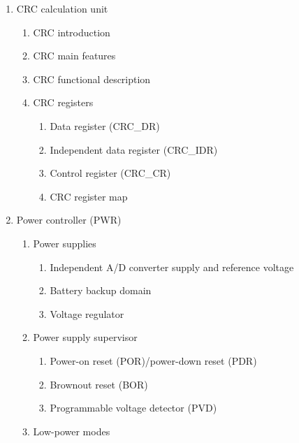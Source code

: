 \documentclass{article}
\begin{document}
\begin{enumerate}
\begin{enumerate}
\begin{enumerate}
            \item Flash option control register (FLASH\_OPTCR) 
            \item Flash interface register map 
        \end{enumerate}
    \end{enumerate}
    \item CRC calculation unit 
    \begin{enumerate}
        \item CRC introduction 
        \item CRC main features 
        \item CRC functional description 
        \item CRC registers 
        \begin{enumerate}
            \item Data register (CRC\_DR) 
            \item Independent data register (CRC\_IDR) 
            \item Control register (CRC\_CR) 
            \item CRC register map 
        \end{enumerate}
    \end{enumerate}
    \item Power controller (PWR) 
    \begin{enumerate}
        \item Power supplies 
        \begin{enumerate}
            \item Independent A/D converter supply and reference voltage 
            \item Battery backup domain 
            \item Voltage regulator 
        \end{enumerate}
        \item Power supply supervisor 
        \begin{enumerate}
            \item Power-on reset (POR)/power-down reset (PDR) 
            \item Brownout reset (BOR) 
            \item Programmable voltage detector (PVD) 
        \end{enumerate}
        \item Low-power modes 

\end{enumerate}
\end{enumerate}
\end{document}
